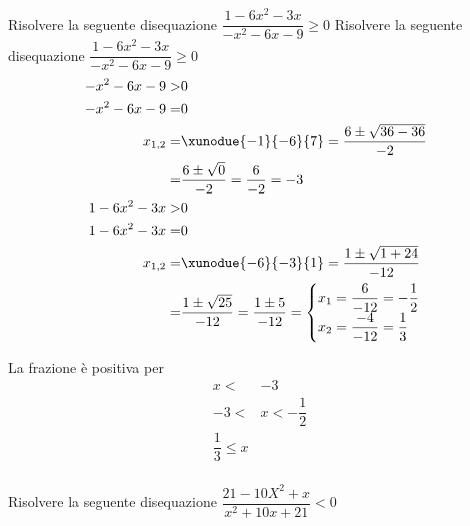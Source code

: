 \begin{exercise}
		Risolvere la seguente disequazione $\dfrac{1-6x^2-3x}{-x^2-6x-9}\geq 0$
	\tcblower
	Risolvere la seguente disequazione $\dfrac{1-6x^2-3x}{-x^2-6x-9}\geq 0$
	\begin{align*}
	-x^2-6x-9>&0\\
	-x^2-6x-9=&0\\
	x_{1,2}=&\xunodue{-1}{-6}{7}=\dfrac{6\pm\sqrt{36-36}}{-2}\\
	=&\dfrac{6\pm\sqrt{0}}{-2}=\dfrac{6}{-2}=-3\\
	1-6x^2-3x>&0\\
	1-6x^2-3x=&0\\
	x_{1,2}=&\xunodue{-6}{-3}{1}=\dfrac{1\pm\sqrt{1+24}}{-12}\\
	=&\dfrac{1\pm\sqrt{25}}{-12}=\dfrac{1\pm 5}{-12}=\begin{cases}
	x_1=\dfrac{6}{-12}=-\dfrac{1}{2}\\
	x_2=\dfrac{-4}{-12}=\dfrac{1}{3}
	\end{cases}\\
	\end{align*}
	\begin{center}
		
	\end{center}
La frazione è positiva per 
	\begin{align*}
	x<&-3\\ -3<&x<-\dfrac{1}{2}\\ \dfrac{1}{3}\leq x\\
	\end{align*}
\end{exercise}
\begin{exercise}[no solution]
		Risolvere la seguente disequazione $\dfrac{21-10X^2+x}{x^2+10x+21}< 0$
\end{exercise}
